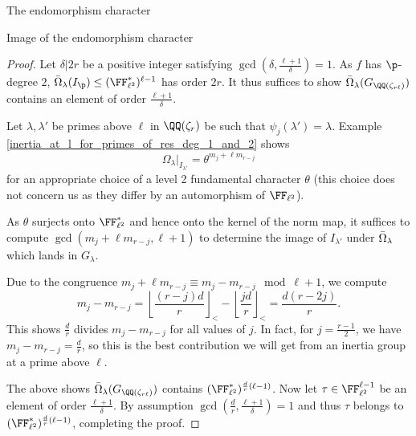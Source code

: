 \documentclass[11pt,a4paper]{article}
\newcommand{\Qr}{{\QQ(\zeta_r)}}
\newcommand{\GQrl}{G_{\QQ(\zeta_{r\ell})}}
\newcommand{\Glam}{G_{\lambda}}
\begin{document}
\begin{section}{The endomorphism character}
\begin{subsection}{Image of the endomorphism character}
\begin{proof}
 Let $\delta|2r$ be a positive integer satisfying $\gcd(\delta, \frac{\ell+1}{\delta})=1$.
 As $f$ has $\p$-degree $2$, $\Bar{\Omega}_\lambda(I_\p) \leq (\FF^*_{\ell^2})^{\ell-1}$ has order $2r$.
It thus suffices to show $\Bar{\Omega}_\lambda(\GQrl)$ contains an element of order $\frac{\ell+1}{\delta}$.

Let $\lambda,\lambda'$ be primes above $\ell$ in $\Qr$ be such that $\psi_j(\lambda')=\lambda$. Example \ref{inertia_at_l_for_primes_of_res_deg_1_and_2} shows
\[
\Omega_\lambda|_{I_{\lambda'}} = \theta^{m_{j} + \ell m_{r-j} }
\]
for an appropriate choice of a level 2 fundamental character $\theta$ (this choice does not concern us as they differ by an automorphism of $\FF_{\ell^2}$).

As $\theta$ surjects onto $\FF_{\ell^2}^*$  and hence onto the kernel of the norm map, it suffices to compute  $\gcd(m_{j} + \ell m_{r-j} , \ell + 1)$ to determine the image of $I_{\lambda'}$ under $\Bar{\Omega}_\lambda$ which lands in $\Glam$.


Due to the congruence $m_{j} + \ell m_{r-j} \equiv m_{j} - m_{r-j}  \mod{ \ell + 1}$, we compute
\[m_{j} - m_{r-j} = \left\lfloor \frac{(r-j)d}{r}\right\rfloor_< - \left\lfloor \frac{jd}{r}\right\rfloor_< = \frac{d(r-2j)}{r}.
\]
This shows  $\frac{d}{r}$ divides $ m_{j} - m_{r-j}$ for all values of $j$. In fact, for $j = \frac{r-1}{2}$, we have $ m_{j} - m_{r-j} = \frac{d}{r}$, so this is the best contribution we will get from an inertia group at a prime above $\ell$.

The above shows $\Bar{\Omega}_\lambda(\GQrl)$ contains $(\FF^*_{\ell^2})^{\frac{d}{r}(\ell-1)}$.
Now let $\tau \in \FF_{\ell^2}^{\ell-1}$ be an element of order $\frac{\ell+1}{\delta}$.
By assumption $\gcd(\frac{d}{r},\frac{\ell+1}{\delta})=1$ and thus $\tau$ belongs to $(\FF^*_{\ell^2})^{\frac{d}{r}(\ell-1)}$, completing the proof.

\end{proof}

\end{subsection}


\end{section}
\end{document}
